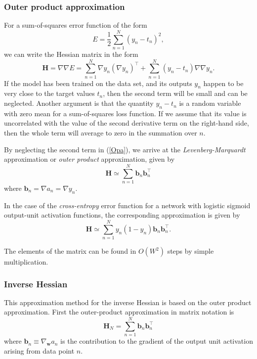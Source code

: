 \documentclass[a4paper]{book}
\renewcommand{\bf}{\mathbf}
\newcommand{\imp}[1]{\textit{#1}}
\begin{document}
\subsubsection{Outer product approximation}
For a sum-of-squares error function of the form
\begin{equation}
	E = \frac{1}{2} \sum_{n=1}^N (y_n-t_n)^2,
\end{equation}
we can write the Hessian matrix in the form
\begin{equation}
	\bf{H} = \nabla \nabla E = \sum_{n=1}^N \nabla y_n (\nabla y_n)^{\intercal} + \sum_{n=1}^N (y_n-t_n) \nabla\nabla y_n. \label{Opa}
\end{equation}
If the model has been trained on the data set, and its outputs $y_n$ happen to be very close to the target values $t_n$, then the second term will be small and can be neglected. Another argument is that the quantity $y_n-t_n$ is a random variable with zero mean for a sum-of-squares loss function. If we assume that its value is uncorrelated with the value of the second derivative term on the right-hand side, then the whole term will average to zero in the summation over $n$.

By neglecting the second term in (\ref{Opa}), we arrive at the \imp{Levenberg-Marquardt} approximation or \imp{outer product} approximation, given by
\begin{equation}
	\bf{H} \simeq \sum_{n=1}^N \bf{b}_n \bf{b}_n^{\intercal}
\end{equation}
where $\bf{b}_n = \nabla a_n = \nabla y_n$. 

In the case of the \emph{cross-entropy} error function for a network with logistic sigmoid output-unit activation functions, the corresponding approximation is given by
\begin{equation}
	\bf{H} \simeq \sum_{n=1}^N y_n (1-y_n) \bf{b}_n \bf{b}_n^{\intercal}.
\end{equation}

The elements of the matrix can be found in $O(W^2)$ steps by simple multiplication.
\subsubsection{Inverse Hessian}
This approximation method for the inverse Hessian is based on the outer product approximation. First the outer-product approximation in matrix notation is
\begin{equation}
	\bf{H}_N  = \sum_{n=1}^N \bf{b}_n \bf{b}_n^{\intercal}
\end{equation}
where $\bf{b}_n \equiv \nabla_{\bf{w}} a_n$ is the contribution to the gradient of the output unit activation arising from data point $n$. 
\end{document}

